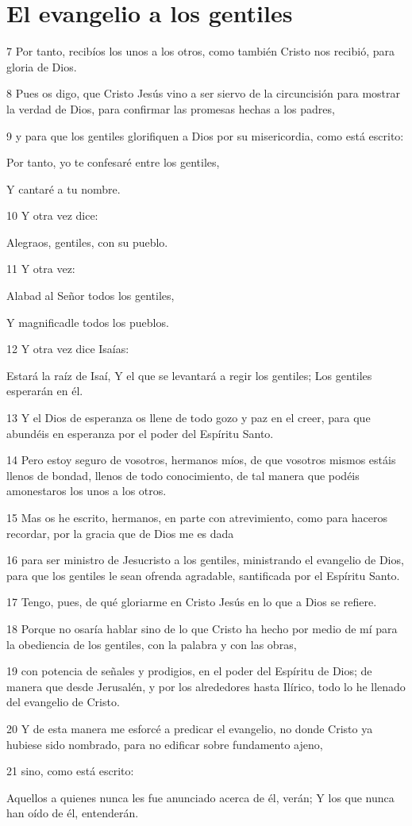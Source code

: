 \section*{El evangelio a los gentiles}

\par 7 Por tanto, recibíos los unos a los otros, como también Cristo nos recibió, para gloria de Dios.
\par 8 Pues os digo, que Cristo Jesús vino a ser siervo de la circuncisión para mostrar la verdad de Dios, para confirmar las promesas hechas a los padres,
\par 9 y para que los gentiles glorifiquen a Dios por su misericordia, como está escrito:
\par Por tanto, yo te confesaré entre los gentiles,
\par Y cantaré a tu nombre.
\par 10 Y otra vez dice:
\par Alegraos, gentiles, con su pueblo.
\par 11 Y otra vez:
\par Alabad al Señor todos los gentiles,
\par Y magnificadle todos los pueblos.
\par 12 Y otra vez dice Isaías:
\par Estará la raíz de Isaí, Y el que se levantará a regir los gentiles; Los gentiles esperarán en él.
\par 13 Y el Dios de esperanza os llene de todo gozo y paz en el creer, para que abundéis en esperanza por el poder del Espíritu Santo.
\par 14 Pero estoy seguro de vosotros, hermanos míos, de que vosotros mismos estáis llenos de bondad, llenos de todo conocimiento, de tal manera que podéis amonestaros los unos a los otros.
\par 15 Mas os he escrito, hermanos, en parte con atrevimiento, como para haceros recordar, por la gracia que de Dios me es dada
\par 16 para ser ministro de Jesucristo a los gentiles, ministrando el evangelio de Dios, para que los gentiles le sean ofrenda agradable, santificada por el Espíritu Santo.
\par 17 Tengo, pues, de qué gloriarme en Cristo Jesús en lo que a Dios se refiere.
\par 18 Porque no osaría hablar sino de lo que Cristo ha hecho por medio de mí para la obediencia de los gentiles, con la palabra y con las obras,
\par 19 con potencia de señales y prodigios, en el poder del Espíritu de Dios; de manera que desde Jerusalén, y por los alrededores hasta Ilírico, todo lo he llenado del evangelio de Cristo.
\par 20 Y de esta manera me esforcé a predicar el evangelio, no donde Cristo ya hubiese sido nombrado, para no edificar sobre fundamento ajeno,
\par 21 sino, como está escrito:
\par Aquellos a quienes nunca les fue anunciado acerca de él, verán; Y los que nunca han oído de él, entenderán.

